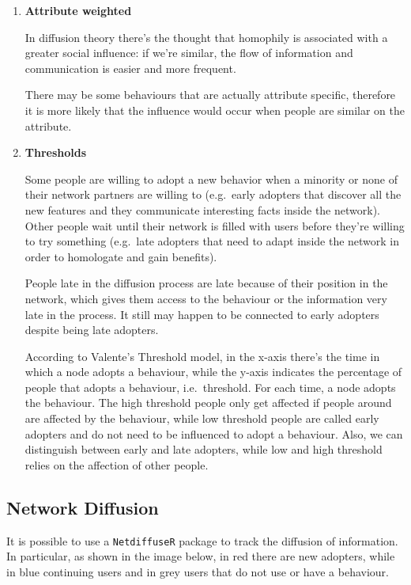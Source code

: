 \documentclass[
  notitlepage,
  onecolumn,
  openany]{book}
\begin{document}
\begin{enumerate}
\def\labelenumi{\arabic{enumi}.}
\setcounter{enumi}{8}
\item
  \textbf{Attribute weighted}

  In diffusion theory there's the thought that homophily is associated with a greater social influence: if we're similar, the flow of information and communication is easier and more frequent.

  There may be some behaviours that are actually attribute specific, therefore it is more likely that the influence would occur when people are similar on the attribute.
\item
  \textbf{Thresholds}

  Some people are willing to adopt a new behavior when a minority or none of their network partners are willing to (e.g.~early adopters that discover all the new features and they communicate interesting facts inside the network). Other people wait until their network is filled with users before they're willing to try something (e.g.~late adopters that need to adapt inside the network in order to homologate and gain benefits).

  People late in the diffusion process are late because of their position in the network, which gives them access to the behaviour or the information very late in the process. It still may happen to be connected to early adopters despite being late adopters.

  According to Valente's Threshold model, in the x-axis there's the time in which a node adopts a behaviour, while the y-axis indicates the percentage of people that adopts a behaviour, i.e.~threshold. For each time, a node adopts the behaviour. The high threshold people only get affected if people around are affected by the behaviour, while low threshold people are called early adopters and do not need to be influenced to adopt a behaviour. Also, we can distinguish between early and late adopters, while low and high threshold relies on the affection of other people.
\end{enumerate}

\hypertarget{network-diffusion}{%
\subsection{Network Diffusion}\label{network-diffusion}}

It is possible to use a \texttt{NetdiffuseR} package to track the diffusion of information. In particular, as shown in the image below, in red there are new adopters, while in blue continuing users and in grey users that do not use or have a behaviour.
\end{document}

